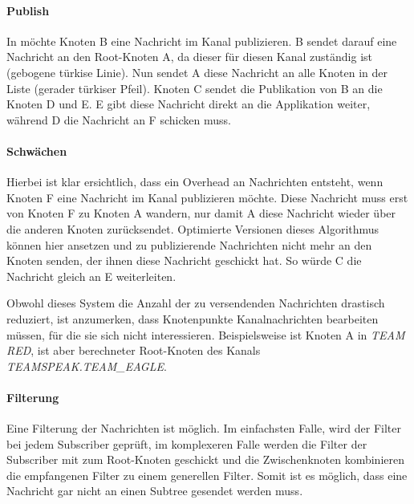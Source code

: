 \paragraph*{Publish}
In  möchte Knoten B eine Nachricht im Kanal publizieren. B sendet darauf eine Nachricht an den Root-Knoten A, da dieser für diesen Kanal zuständig ist (gebogene türkise Linie). Nun sendet A diese Nachricht an alle Knoten in der Liste (gerader türkiser Pfeil). Knoten C sendet die Publikation von B an die Knoten D und E. E gibt diese Nachricht direkt an die Applikation weiter, während D die Nachricht an F schicken muss.


\paragraph*{Schwächen}
Hierbei ist klar ersichtlich, dass ein Overhead an Nachrichten entsteht, wenn Knoten F eine Nachricht im Kanal publizieren möchte. Diese Nachricht muss erst von Knoten F zu Knoten A wandern, nur damit A diese Nachricht wieder über die anderen Knoten zurücksendet. Optimierte Versionen dieses Algorithmus können hier ansetzen und zu publizierende Nachrichten nicht mehr an den Knoten senden, der ihnen diese Nachricht geschickt hat. So würde C die Nachricht gleich an E weiterleiten.


Obwohl dieses System die Anzahl der zu versendenden Nachrichten drastisch reduziert, ist anzumerken, dass Knotenpunkte Kanalnachrichten bearbeiten müssen, für die sie sich nicht interessieren. Beispielsweise ist Knoten A in \emph{TEAM RED}, ist aber berechneter Root-Knoten des Kanals \emph{TEAMSPEAK.TEAM\_EAGLE}.


\paragraph*{Filterung}
Eine Filterung der Nachrichten ist möglich. Im einfachsten Falle, wird der Filter bei jedem Subscriber geprüft, im komplexeren Falle werden die Filter der Subscriber mit zum Root-Knoten geschickt und die Zwischenknoten kombinieren die empfangenen Filter zu einem generellen Filter. Somit ist es möglich, dass eine Nachricht gar nicht an einen Subtree gesendet werden muss.


